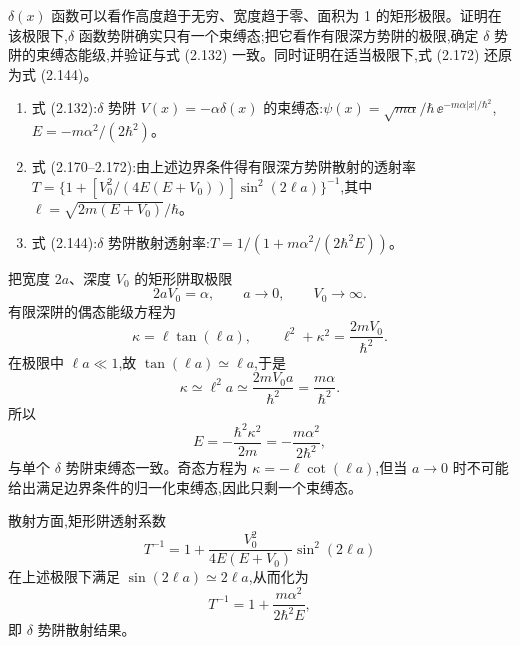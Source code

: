\begin{question}
$\delta(x)$ 函数可以看作高度趋于无穷、宽度趋于零、面积为 1 的矩形极限。证明在该极限下,$\delta$ 函数势阱确实只有一个束缚态;把它看作有限深方势阱的极限,确定 $\delta$ 势阱的束缚态能级,并验证与式 (2.132) 一致。同时证明在适当极限下,式 (2.172) 还原为式 (2.144)。

\par\smallskip
{}
\begin{enumerate}[leftmargin=2.2em,itemsep=0.12em,topsep=0.12em,parsep=0pt]
\item 式 (2.132):$\delta$ 势阱 $V(x)=-\alpha\delta(x)$ 的束缚态:$\psi(x)=\sqrt{m\alpha}/\hbar\,\ee^{-m\alpha|x|/\hbar^2}$,$E=-m\alpha^2/(2\hbar^2)$。
\item 式 (2.170--2.172):由上述边界条件得有限深方势阱散射的透射率 $T=\{1+[V_0^2/(4E(E+V_0))]\sin^2(2\ell a)\}^{-1}$,其中 $\ell=\sqrt{2m(E+V_0)}/\hbar$。
\item 式 (2.144):$\delta$ 势阱散射透射率:$T=1/(1+m\alpha^2/(2\hbar^2E))$。
\end{enumerate}

\begin{solution}
把宽度 $2a$、深度 $V_0$ 的矩形阱取极限
\[
2aV_0=\alpha,
\qquad a\to0,
\qquad V_0\to\infty.
\]
有限深阱的偶态能级方程为
\[
\kappa=\ell\tan(\ell a),
\qquad
\ell^2+\kappa^2=\frac{2mV_0}{\hbar^2}.
\]
在极限中 $\ell a\ll1$,故 $\tan(\ell a)\simeq \ell a$,于是
\[
\kappa\simeq \ell^2a\simeq \frac{2mV_0a}{\hbar^2}=\frac{m\alpha}{\hbar^2}.
\]
所以
\[
E=-\frac{\hbar^2\kappa^2}{2m}=-\frac{m\alpha^2}{2\hbar^2},
\]
与单个 $\delta$ 势阱束缚态一致。奇态方程为 $\kappa=-\ell\cot(\ell a)$,但当 $a\to0$ 时不可能给出满足边界条件的归一化束缚态,因此只剩一个束缚态。

散射方面,矩形阱透射系数
\[
T^{-1}=1+\frac{V_0^2}{4E(E+V_0)}\sin^2(2\ell a)
\]
在上述极限下满足 $\sin(2\ell a)\simeq 2\ell a$,从而化为
\[
T^{-1}=1+\frac{m\alpha^2}{2\hbar^2E},
\]
即 $\delta$ 势阱散射结果。
\end{solution}
\end{question}

